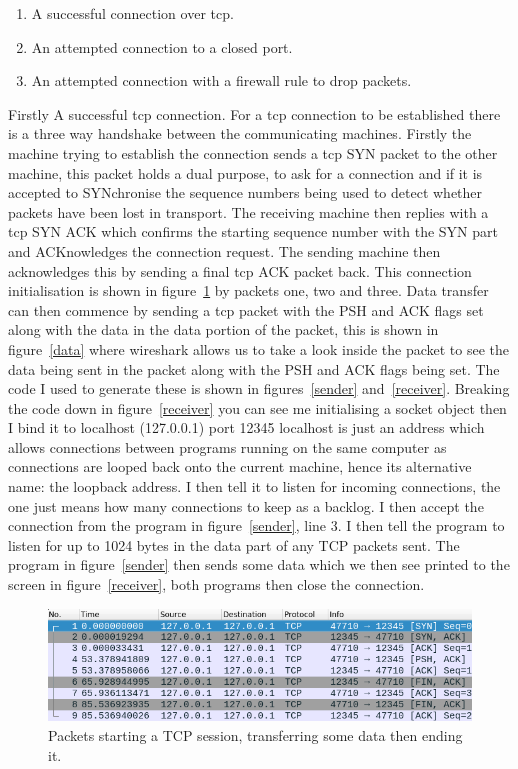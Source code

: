 \documentclass[titlepage]{article}
\begin{document}
\begin{enumerate}
  \item{A successful connection over \gls{tcp}.}
  \item{An attempted connection to a closed port.}
  \item{An attempted connection with a firewall rule to drop packets.}
\end{enumerate}
Firstly A successful \gls{tcp} connection. For a \gls{tcp} connection to be established there
is a three way handshake between the communicating machines. Firstly the machine trying to
establish the connection sends a \gls{tcp} SYN packet to the other machine, this packet
holds a dual purpose, to ask for a connection and if it is accepted to SYNchronise the sequence
numbers being used to detect whether packets have been lost in transport. The receiving machine
then replies with a \gls{tcp} SYN ACK which confirms the starting sequence number with the SYN part
and ACKnowledges the connection request. The sending machine then acknowledges this by sending a
final \gls{tcp} ACK packet back. This connection initialisation is shown in figure~\ref{data_transfer}
by packets one, two and three. Data transfer can then commence by sending a \gls{tcp} packet with
the PSH and ACK flags set along with the data in the data portion of the packet, this is shown
in figure~\ref{data} where wireshark allows us to take a look inside the packet to see the data being
sent in the packet along with the PSH and ACK flags being set. The code I used to generate these
is shown in figures~\ref{sender} and~\ref{receiver}. Breaking the code down in figure~\ref{receiver}
you can see me initialising a socket object then I bind it to localhost (127.0.0.1) port 12345
localhost is just an address which allows connections between programs running on the same computer
as connections are looped back onto the current machine, hence its alternative name: the loopback
address. I then tell it to listen for incoming connections, the one just means how many connections
to keep as a backlog. I then accept the connection from the program in figure~\ref{sender}, line 3.
I then tell the program to listen for up to 1024 bytes in the data part of any TCP packets sent.
The program in figure~\ref{sender} then sends some data which we then see printed to the screen
in figure~\ref{receiver}, both programs then close the connection.

\begin{figure}[H]
  \centering
  \includegraphics[width=\textwidth]{screenshots/data_transfer.png}
  \caption{%
    Packets starting a TCP session, transferring some data then ending it.
  }\label{data_transfer}
\end{figure}
\end{document}
